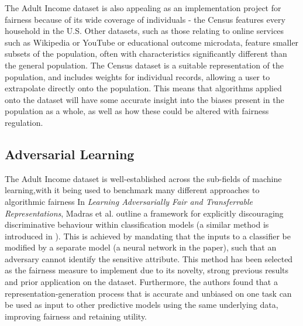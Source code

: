 \documentclass[conference]{IEEEtran}
\begin{document}
The Adult Income dataset is also appealing as an implementation project for fairness because of its wide coverage of individuals - the Census features every household in the U.S. Other datasets, such as those relating to online services such as Wikipedia or YouTube or educational outcome microdata, feature smaller subsets of the population, often with characteristics significantly different than the general population. The Census dataset is a suitable representation of the population, and includes weights for individual records, allowing a user to extrapolate directly onto the population. This means that algorithms applied onto the dataset will have some accurate insight into the biases present in the population as a whole, as well as how these could be altered with fairness regulation.
\subsection{Adversarial Learning}
The Adult Income dataset is well-established across the sub-fields of machine learning,with it being used to benchmark many different approaches to algorithmic fairness In \emph{Learning Adversarially Fair and Transferrable Representations}, Madras et al. outline a framework for explicitly discouraging discriminative behaviour within classification models\cite{DBLP:journals/corr/abs-1802-06309} (a similar method is introduced in \cite{Adel_Valera_Ghahramani_Weller_2019}). This is achieved by mandating that the inputs to a classifier be modified by a separate model (a neural network in the paper), such that an adversary cannot identify the sensitive attribute. This method has been selected as the fairness measure to implement due to its novelty, strong previous results and prior application on the dataset. Furthermore, the authors found that a representation-generation process that is accurate and unbiased on one task can be used as input to other predictive models using the same underlying data, improving fairness and retaining utility.
\end{document}
